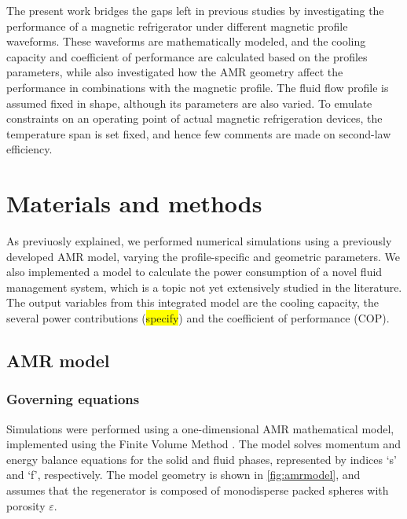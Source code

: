 \documentclass[referee]{svjour3}
\begin{document}
The present work bridges the gaps left in previous studies by investigating the performance of a magnetic refrigerator under different magnetic profile waveforms. These waveforms are mathematically modeled, and the cooling capacity and coefficient of performance are calculated based on the profiles parameters, while also investigated how the AMR geometry affect the performance in combinations with the magnetic profile. The fluid flow profile is assumed fixed in shape, although its parameters are also varied. To emulate constraints on an operating point of actual magnetic refrigeration devices, the temperature span is set fixed, and hence few comments are made on second-law efficiency.

\section{Materials and methods}
\label{sec:materials-methods}

As previuosly explained, we performed numerical simulations using a previously developed AMR model, varying the profile-specific and geometric parameters. We also implemented a model to calculate the power consumption of a novel fluid management system, which is a topic not yet extensively studied in the literature. The output variables from this integrated model are the cooling capacity, the several power contributions (\colorbox{yellow}{specify}) and the coefficient of performance (COP).


\subsection{AMR model}
\label{sec:amr-model}

\subsubsection{Governing equations}
\label{sec:governing-equations}

Simulations were performed using a one-dimensional AMR mathematical model, implemented using the Finite Volume Method \cite{bib:trevizoli16_perfor_model}. The model solves momentum and energy balance equations for the solid and fluid phases, represented by indices `s' and `f', respectively. The model geometry is shown in \autoref{fig:amrmodel}, and assumes that the regenerator is composed of monodisperse packed spheres with porosity $\varepsilon$.
\end{document}
